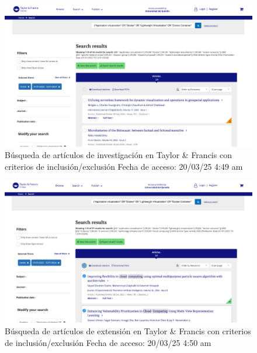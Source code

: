 \FloatBarrier
\begin{figure}[htbp]
    \centering
    \includegraphics[width=\textwidth,keepaspectratio]{apendices/BD/criterios/TF-inv.png}
    \caption{Búsqueda de artículos de investigación en Taylor \& Francis con criterios de inclusión/exclusión
    Fecha de acceso: 20/03/25 4:49 am
    }\label{fig:busqueda29}
\end{figure}
\FloatBarrier
\begin{figure}[htbp]
    \centering
    \includegraphics[width=\textwidth,keepaspectratio]{apendices/BD/criterios/TF-ind.png}
    \caption{Búsqueda de artículos de extensión en Taylor \& Francis con criterios de inclusión/exclusión
    Fecha de acceso: 20/03/25 4:50 am
    }\label{fig:busqueda30}
\end{figure}
\FloatBarrier

